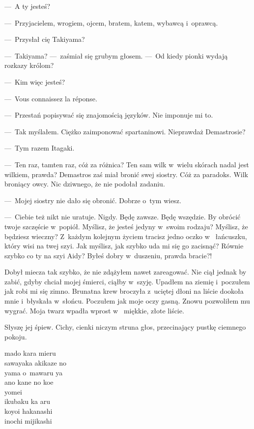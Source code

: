 ---~A ty jesteś?

---~Przyjacielem, wrogiem, ojcem, bratem, katem, wybawcą i~oprawcą.

---~Przysłał cię Takiyama?

---~Takiyama? ---~zaśmiał się grubym głosem. ---~Od kiedy pionki wydają rozkazy królom?

---~Kim więc jesteś?

---~Vous connaissez la réponse.

---~Przestań popisywać się znajomością języków. Nie imponuje mi to.

---~Tak myślałem. Ciężko zaimponować spartaninowi. Nieprawdaż Demastrosie?

---~Tym razem Itagaki.

---~Ten raz, tamten raz, cóż za różnica? Ten sam wilk w~wielu skórach nadal jest wilkiem, prawda? Demastros zaś miał 
bronić swej siostry. Cóż za paradoks. Wilk broniący owcy. Nic dziwnego, że nie podołał zadaniu.

---~Mojej siostry nie dało się obronić. Dobrze o~tym wiesz.

---~Ciebie też nikt nie uratuje. Nigdy. Będę zawsze. Będę wszędzie. By obrócić twoje szczęście w~popiół. Myślisz, że 
jesteś jedyny w~swoim rodzaju? Myślisz, że będziesz wieczny? Z~każdym kolejnym życiem tracisz jedno oczko w~
łańcuszku, który wisi na twej szyi. Jak myślisz, jak szybko uda mi się go zacisnąć? Równie szybko co ty na szyi Aidy? 
Byłeś dobry w~duszeniu, prawda bracie?!

Dobył miecza tak szybko, że nie zdążyłem nawet zareagować. Nie ciął jednak by zabić, gdyby chciał mojej śmierci, 
ciąłby w~szyję. Upadłem na ziemię i~poczułem jak robi mi się zimno. Brunatna krew broczyła z~uciętej dłoni na liście 
dookoła mnie i~błyskała w~słońcu. Poczułem jak moje oczy gasną. Znowu pozwoliłem mu wygrać. Moja twarz wpadła wprost w
~miękkie, złote liście.

\paraSep

Słyszę jej śpiew. Cichy, cienki niczym struna głos, przecinający pustkę ciemnego pokoju.

\begin{itquote}
mado kara mieru\\
sawayaka akikaze no\\
yama o~mawaru ya\\
ano kane no koe\\
yomei\\
ikubaku ka aru\\
koyoi hakanashi\\
inochi mijikashi\\
\end{itquote}

